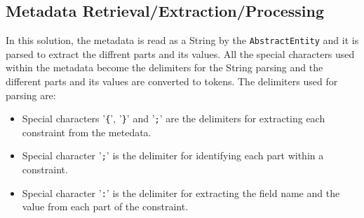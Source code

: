 % 		
% 	
% 	
% 
% 
% 	 
% 	 
% 	
	
\subsection{Metadata Retrieval/Extraction/Processing}
	In this solution, the metadata is read as a String by the
	\texttt{AbstractEntity} and it is parsed to extract the diffrent parts and its
	values. All the special characters used within the metadata become the
	delimiters for the String parsing and  the different parts and
	its values are converted to tokens. 
	The delimiters used for parsing are:
		\begin{itemize}
		  \item Special characters '\texttt{\{}', '\texttt{\}}' and '\texttt{;}' are
		  the delimiters for extracting each constraint from the metedata.
		  \item Special character '\texttt{;}' is the delimiter for identifying each
		  part within a constraint.
		  \item Special character '\texttt{:}' is the delimiter for extracting the
		  field name and the value from each part of the constraint.
		\end{itemize}
		
